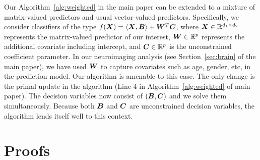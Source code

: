 \documentclass[11pt]{article}
\theoremstyle{plain}
\theoremstyle{definition}
\begin{document}
Our Algorithm~\ref{alg:weighted} in the main paper can be extended to a mixture of matrix-valued predictors and usual vector-valued predictors. Specifically, we consider classifiers of the type $f(\bm X)=\langle \bm X, \bm B\rangle+\bm{W}^T\bm C$, where $\bm X\in\mathbb{R}^{d_1\times d_2}$ represents the matrix-valued predictor of our interest, $\bm{W}\in\mathbb{R}^{p}$ represents the additional covariate including intercept, and $\bm C\in\mathbb{R}^p$ is the unconstrained coefficient parameter. In our neuroimaging analysis (see Section~\ref{sec:brain} of the main paper), we have used $\bm{W}$ to capture covariates such as age, gender, etc, in the prediction model. Our algorithm is amenable to this case. The only change is the primal update in the algorithm (Line 4 in Algorithm~\ref{alg:weighted} of main paper). The decision variables now consist of $(\bm B,\bm C)$ and we solve them simultaneously. Because both $\bm B$ and $\bm C$ are unconstrained decision variables, the algorithm lends itself well to this context. 


\clearpage
\section{Proofs}\label{sec:proofs}
\end{document}
